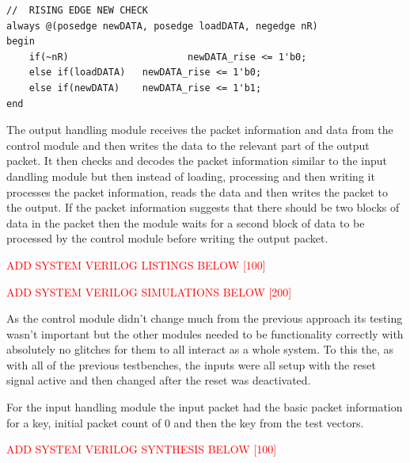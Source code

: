 \documentclass[12pt,twoside,a4paper]{report}
\begin{document}
 	\begin{minipage}{\linewidth}
	\begin{lstlisting}[label={lst:new_rise},caption={The $always\_ff$ blocks used for risnig edge new data checks},style=CStyle]
//	RISING EDGE NEW CHECK
always @(posedge newDATA, posedge loadDATA, negedge nR)
begin
	if(~nR)						newDATA_rise <= 1'b0;
	else if(loadDATA)	newDATA_rise <= 1'b0;
	else if(newDATA)	newDATA_rise <= 1'b1;
end
	\end{lstlisting}
	\end{minipage}
	
	The output handling module receives the packet information and data from the control module and then writes the data to the relevant part of the output packet. It then checks and decodes the packet information similar to the input dandling module but then instead of loading, processing and then writing it processes the packet information, reads the data and then writes the packet to the output. If the packet information suggests that there should be two blocks of data in the packet then the module waits for a second block of data to be processed by the control module before writing the output packet.
    
	\textcolor{red}{ADD SYSTEM VERILOG LISTINGS BELOW [100]}
    
	\textcolor{red}{ADD SYSTEM VERILOG SIMULATIONS BELOW [200]}
	
	As the control module didn't change much from the previous approach its testing wasn't important but the other modules needed to be functionality correctly with absolutely no glitches for them to all interact as a whole system. To this the, as with all of the previous testbenches, the inputs were all setup with the reset signal active and then changed after the reset was deactivated.

	For the input handling module the input packet had the basic packet information for a key, initial packet count of $0$ and then the key from the test vectors.

	\textcolor{red}{ADD SYSTEM VERILOG SYNTHESIS BELOW [100]}
	
\end{document}
